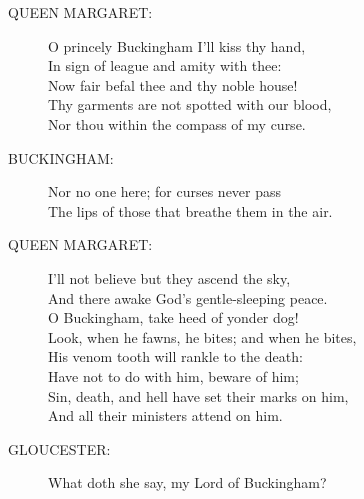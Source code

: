 \documentclass{article}
\begin{document}
\begin{description}
\item[QUEEN MARGARET:] 
\hspace{1pt}O princely Buckingham I'll kiss thy hand,\\
\hspace{1pt}In sign of league and amity with thee:\\
\hspace{1pt}Now fair befal thee and thy noble house!\\
\hspace{1pt}Thy garments are not spotted with our blood,\\
\hspace{1pt}Nor thou within the compass of my curse.\\
\end{description}
\begin{description}
\item[BUCKINGHAM:] 
\hspace{1pt}Nor no one here; for curses never pass\\
\hspace{1pt}The lips of those that breathe them in the air.\\
\end{description}
\begin{description}
\item[QUEEN MARGARET:] 
\hspace{1pt}I'll not believe but they ascend the sky,\\
\hspace{1pt}And there awake God's gentle-sleeping peace.\\
\hspace{1pt}O Buckingham, take heed of yonder dog!\\
\hspace{1pt}Look, when he fawns, he bites; and when he bites,\\
\hspace{1pt}His venom tooth will rankle to the death:\\
\hspace{1pt}Have not to do with him, beware of him;\\
\hspace{1pt}Sin, death, and hell have set their marks on him,\\
\hspace{1pt}And all their ministers attend on him.\\
\end{description}
\begin{description}
\item[GLOUCESTER:] 
\hspace{1pt}What doth she say, my Lord of Buckingham?\\
\end{description}
\end{document}
